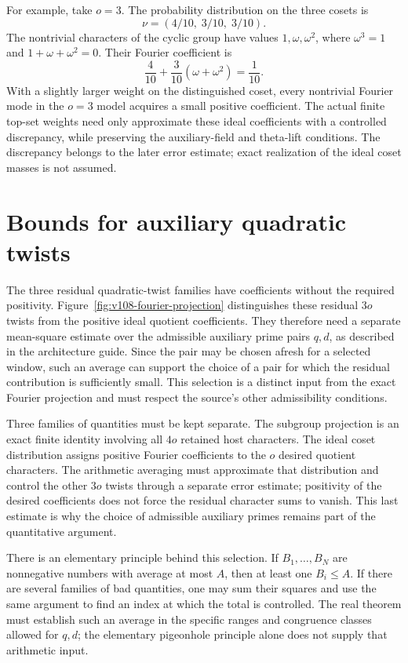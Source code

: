 \documentclass[11pt,openany,oneside]{scrbook}
\theoremstyle{definition}
\theoremstyle{remark}
\begin{document}
For example, take $o=3$. The probability distribution on the three cosets is
\[
\nu=(4/10,\;3/10,\;3/10).
\]
The nontrivial characters of the cyclic group have values $1,\omega,\omega^2$, where $\omega^3=1$ and $1+\omega+\omega^2=0$. Their Fourier coefficient is
\[
\frac4{10}+\frac3{10}(\omega+\omega^2)=\frac1{10}.
\]
With a slightly larger weight on the distinguished coset, every nontrivial Fourier mode in the $o=3$ model acquires a small positive coefficient. The actual finite top-set weights need only approximate these ideal coefficients with a controlled discrepancy, while preserving the auxiliary-field and theta-lift conditions. The discrepancy belongs to the later error estimate; exact realization of the ideal coset masses is not assumed.

\section{Bounds for auxiliary quadratic twists}

The three residual quadratic-twist families have coefficients without the required positivity. Figure~\ref{fig:v108-fourier-projection} distinguishes these residual $3o$ twists from the positive ideal quotient coefficients. They therefore need a separate mean-square estimate over the admissible auxiliary prime pairs $q,d$, as described in the architecture guide. Since the pair may be chosen afresh for a selected window, such an average can support the choice of a pair for which the residual contribution is sufficiently small. This selection is a distinct input from the exact Fourier projection and must respect the source's other admissibility conditions.

Three families of quantities must be kept separate. The subgroup projection is an exact finite identity involving all $4o$ retained host characters. The ideal coset distribution assigns positive Fourier coefficients to the $o$ desired quotient characters. The arithmetic averaging must approximate that distribution and control the other $3o$ twists through a separate error estimate; positivity of the desired coefficients does not force the residual character sums to vanish. This last estimate is why the choice of admissible auxiliary primes remains part of the quantitative argument.

There is an elementary principle behind this selection. If $B_1,\ldots,B_N$ are nonnegative numbers with average at most $A$, then at least one $B_i\le A$. If there are several families of bad quantities, one may sum their squares and use the same argument to find an index at which the total is controlled. The real theorem must establish such an average in the specific ranges and congruence classes allowed for $q,d$; the elementary pigeonhole principle alone does not supply that arithmetic input.
\end{document}
